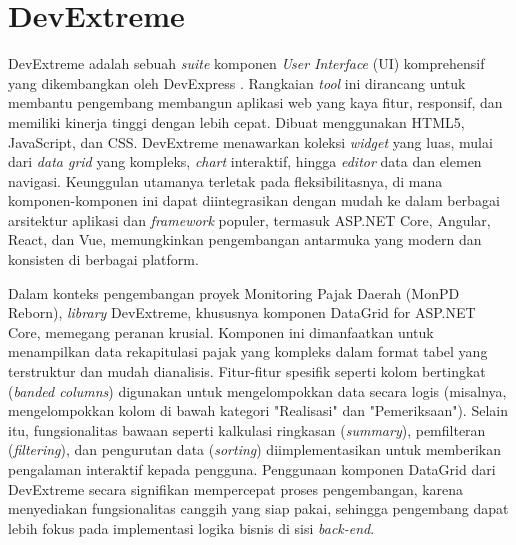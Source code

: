\section{DevExtreme}
\label{sec:devextreme}

DevExtreme adalah sebuah \emph{suite} komponen \emph{User Interface} (UI) komprehensif yang dikembangkan oleh DevExpress \cite{devexpress_js_dev}. Rangkaian \emph{tool} ini dirancang untuk membantu pengembang membangun aplikasi web yang kaya fitur, responsif, dan memiliki kinerja tinggi dengan lebih cepat. Dibuat menggunakan HTML5, JavaScript, dan CSS. DevExtreme menawarkan koleksi \emph{widget} yang luas, mulai dari \emph{data grid} yang kompleks, \emph{chart} interaktif, hingga \emph{editor} data dan elemen navigasi. Keunggulan utamanya terletak pada fleksibilitasnya, di mana komponen-komponen ini dapat diintegrasikan dengan mudah ke dalam berbagai arsitektur aplikasi dan \emph{framework} populer, termasuk ASP.NET Core, Angular, React, dan Vue, memungkinkan pengembangan antarmuka yang modern dan konsisten di berbagai platform.

Dalam konteks pengembangan proyek Monitoring Pajak Daerah (MonPD Reborn), \emph{library} DevExtreme, khususnya komponen DataGrid for ASP.NET Core, memegang peranan krusial. Komponen ini dimanfaatkan untuk menampilkan data rekapitulasi pajak yang kompleks dalam format tabel yang terstruktur dan mudah dianalisis. Fitur-fitur spesifik seperti kolom bertingkat (\emph{banded columns}) digunakan untuk mengelompokkan data secara logis (misalnya, mengelompokkan kolom di bawah kategori "Realisasi" dan "Pemeriksaan"). Selain itu, fungsionalitas bawaan seperti kalkulasi ringkasan (\emph{summary}), pemfilteran (\emph{filtering}), dan pengurutan data (\emph{sorting}) diimplementasikan untuk memberikan pengalaman interaktif kepada pengguna. Penggunaan komponen DataGrid dari DevExtreme secara signifikan mempercepat proses pengembangan, karena menyediakan fungsionalitas canggih yang siap pakai, sehingga pengembang dapat lebih fokus pada implementasi logika bisnis di sisi \emph{back-end}.

